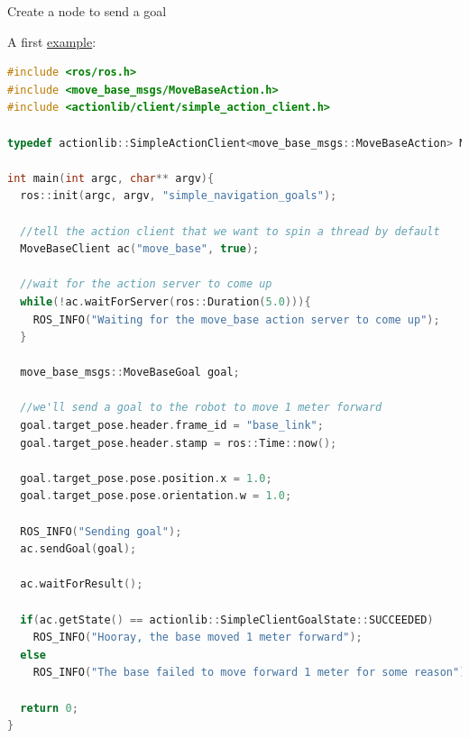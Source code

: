 \begin{frame}{Create a node to send a goal}


A first \href{http://wiki.ros.org/navigation/Tutorials/SendingSimpleGoals}{example}:
\begin{lstlisting}[language=c]
#include <ros/ros.h>
#include <move_base_msgs/MoveBaseAction.h>
#include <actionlib/client/simple_action_client.h>

typedef actionlib::SimpleActionClient<move_base_msgs::MoveBaseAction> MoveBaseClient;

int main(int argc, char** argv){
  ros::init(argc, argv, "simple_navigation_goals");

  //tell the action client that we want to spin a thread by default
  MoveBaseClient ac("move_base", true);

  //wait for the action server to come up
  while(!ac.waitForServer(ros::Duration(5.0))){
    ROS_INFO("Waiting for the move_base action server to come up");
  }

  move_base_msgs::MoveBaseGoal goal;

  //we'll send a goal to the robot to move 1 meter forward
  goal.target_pose.header.frame_id = "base_link";
  goal.target_pose.header.stamp = ros::Time::now();

  goal.target_pose.pose.position.x = 1.0;
  goal.target_pose.pose.orientation.w = 1.0;

  ROS_INFO("Sending goal");
  ac.sendGoal(goal);

  ac.waitForResult();

  if(ac.getState() == actionlib::SimpleClientGoalState::SUCCEEDED)
    ROS_INFO("Hooray, the base moved 1 meter forward");
  else
    ROS_INFO("The base failed to move forward 1 meter for some reason");

  return 0;
}
\end{lstlisting}

\end{frame}




